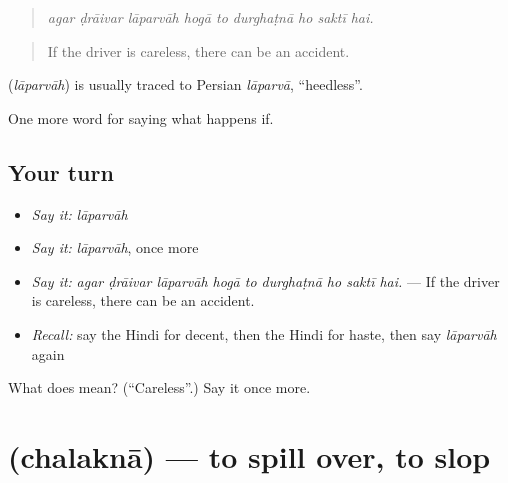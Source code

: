 \begin{quote}
        
\end{quote}

\begin{quote}
\emph{agar ḍrāivar lāparvāh hogā to durghaṭnā ho saktī hai.}
\end{quote}

\begin{quote}
If the driver is careless, there can be an accident.
\end{quote}

\begin{cousinweb}
\textbf{} (\emph{lāparvāh}) is usually traced to Persian \emph{lāparvā}, \textquotedblleft{}heedless\textquotedblright{}.
\end{cousinweb}

\begin{grammarlens}[title={What you've built}]
One more word for saying what happens if.
\end{grammarlens}

\subsection*{Your turn}
\begin{itemize}
\raggedright
  \item \emph{Say it:} \emph{lāparvāh}
  \item \emph{Say it:} \emph{lāparvāh}, once more
  \item \emph{Say it:} \emph{agar ḍrāivar lāparvāh hogā to durghaṭnā ho saktī hai.} — If the driver is careless, there can be an accident.
  \item \emph{Recall:} say the Hindi for decent, then the Hindi for haste, then say \emph{lāparvāh} again
\end{itemize}

\begin{tcolorbox}[breakable,colback=teal!4,colframe=teal!35!black,title={Before you move on}]
What does  mean? (\textquotedblleft{}Careless\textquotedblright{}.) Say it once more.
\end{tcolorbox}
\section[\texorpdfstring{\hi{छलकना} (chalaknā)}{छलकना (chalaknā)}]{ (chalaknā) — to spill over, to slop}

